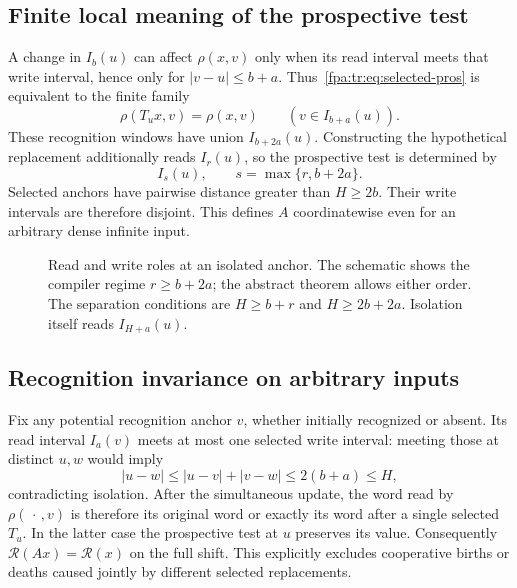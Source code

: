 \documentclass[11pt,a4paper]{article}
\numberwithin{equation}{section}
\newcommand{\Rec}{\mathcal R}\newcommand{\Sel}{\mathcal S}
\begin{document}
\subsection{Finite local meaning of the prospective test}
A change in $I_b(u)$ can affect $\rho(x,v)$ only when its read interval meets that write interval, hence only for $|v-u|\le b+a$. Thus~\eqref{fpa:tr:eq:selected-pros} is equivalent to the finite family
\[
\rho(T_u x,v)=\rho(x,v)\qquad (v\in I_{b+a}(u)).
\]
These recognition windows have union $I_{b+2a}(u)$. Constructing the hypothetical replacement additionally reads $I_r(u)$, so the prospective test is determined by
\begin{equation}\label{fpa:tr:eq:prospective-read}
I_s(u),\qquad s=\max\{r,b+2a\}.
\end{equation}
Selected anchors have pairwise distance greater than $H\ge2b$. Their write intervals are therefore disjoint. This defines $A$ coordinatewise even for an arbitrary dense infinite input.

\begin{figure}[htbp]
\centering
{}
\caption{Read and write roles at an isolated anchor. The schematic shows the compiler regime $r\ge b+2a$; the abstract theorem allows either order. The separation conditions are $H\ge b+r$ and $H\ge2b+2a$. Isolation itself reads $I_{H+a}(u)$.}
\label{fpa:tr:fig:windows}
\end{figure}

\subsection{Recognition invariance on arbitrary inputs}
Fix any potential recognition anchor $v$, whether initially recognized or absent. Its read interval $I_a(v)$ meets at most one selected write interval: meeting those at distinct $u,w$ would imply
\[
|u-w|\le|u-v|+|v-w|\le2(b+a)\le H,
\]
contradicting isolation. After the simultaneous update, the word read by $\rho(\,\cdot\,,v)$ is therefore its original word or exactly its word after a single selected $T_u$. In the latter case the prospective test at $u$ preserves its value. Consequently $\Rec(Ax)=\Rec(x)$ on the full shift. This explicitly excludes cooperative births or deaths caused jointly by different selected replacements.
\end{document}
